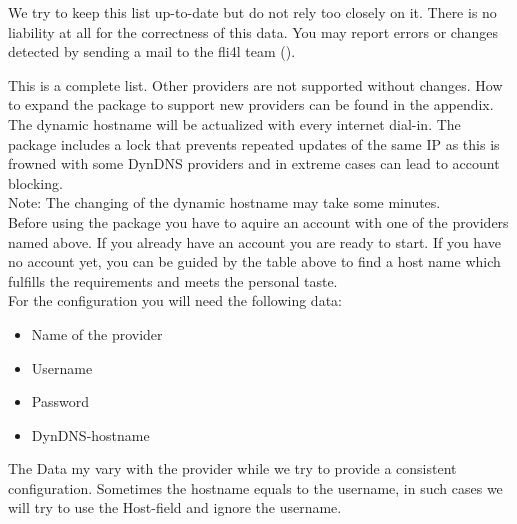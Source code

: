 				  
  
	We try to keep this list up-to-date but do not rely too closely on it. There
	is no liability at all for the correctness of this data. You may report errors
	or changes detected by sending a mail to the fli4l team ().

	This is a complete list. Other providers are not supported without changes. How 
	to expand the package to support new providers can be found in the appendix.\\

	The dynamic hostname will be actualized with every internet dial-in. 
	The package includes a lock that prevents repeated updates of the 
	same IP as this is frowned with some DynDNS providers and in extreme 
	cases can lead to account blocking.\\
	
	Note: The changing of the dynamic hostname may take some minutes.\\
	
	Before using the package you have to aquire an account with one of the 
	providers named above. If you already have an account you are ready to 
	start. If you have no account yet, you can be guided by the table above 
	to find a host name which fulfills the requirements and meets the personal 
	taste.\\
	
	For the configuration you will need the following data:
	
	\begin{itemize}
		\item Name of the provider
		\item Username
		\item Password
		\item DynDNS-hostname
	\end{itemize}

	The Data my vary with the provider while we try to provide a 
	consistent configuration. Sometimes the hostname equals to the 
	username, in such cases we will try to use the Host-field and 
	ignore the username.

